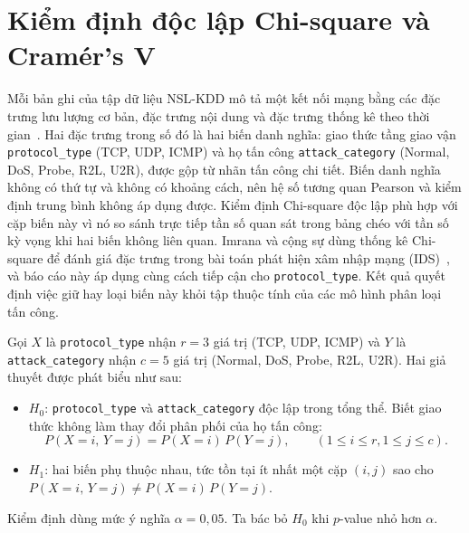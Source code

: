 \documentclass[../main.tex]{subfiles}
\begin{document}
\section{Kiểm định độc lập Chi-square và Cramér’s V}
\label{sec:t34:method}

Mỗi bản ghi của tập dữ liệu NSL-KDD mô tả một kết nối mạng bằng các đặc trưng lưu lượng cơ bản, đặc trưng nội dung và đặc trưng thống kê theo thời gian~\cite{task2_kdd1999}. Hai đặc trưng trong số đó là hai biến danh nghĩa: giao thức tầng giao vận \texttt{protocol\_type} (TCP, UDP, ICMP) và họ tấn công \texttt{attack\_category} (Normal, DoS, Probe, R2L, U2R), được gộp từ nhãn tấn công chi tiết. Biến danh nghĩa không có thứ tự và không có khoảng cách, nên hệ số tương quan Pearson và kiểm định trung bình không áp dụng được. Kiểm định Chi-square độc lập phù hợp với cặp biến này vì nó so sánh trực tiếp tần số quan sát trong bảng chéo với tần số kỳ vọng khi hai biến không liên quan. Imrana và cộng sự dùng thống kê Chi-square để đánh giá đặc trưng trong bài toán phát hiện xâm nhập mạng (IDS)~\cite{task2_imrana2022}, và báo cáo này áp dụng cùng cách tiếp cận cho \texttt{protocol\_type}. Kết quả quyết định việc giữ hay loại biến này khỏi tập thuộc tính của các mô hình phân loại tấn công.

Gọi $X$ là \texttt{protocol\_type} nhận $r = 3$ giá trị (TCP, UDP, ICMP) và $Y$ là \texttt{attack\_\allowbreak{}category} nhận $c = 5$ giá trị (Normal, DoS, Probe, R2L, U2R). Hai giả thuyết được phát biểu như sau:
\begin{itemize}
  \item $H_0$: \texttt{protocol\_type} và \texttt{attack\_category} độc lập trong tổng thể. Biết giao thức không làm thay đổi phân phối của họ tấn công:
    \begin{equation}
      \label{eq:t34:independence}
      P(X = i,\, Y = j) = P(X = i)\,P(Y = j), \qquad (1\le i \le r, 1\le j \le c).
    \end{equation}
  \item $H_1$: hai biến phụ thuộc nhau, tức tồn tại ít nhất một cặp $(i, j)$ sao cho $P(X = i,\, Y = j) \neq P(X = i)\,P(Y = j)$.
\end{itemize}
Kiểm định dùng mức ý nghĩa $\alpha = 0{,}05$. Ta bác bỏ $H_0$ khi $p$-value nhỏ hơn $\alpha$.
\end{document}
